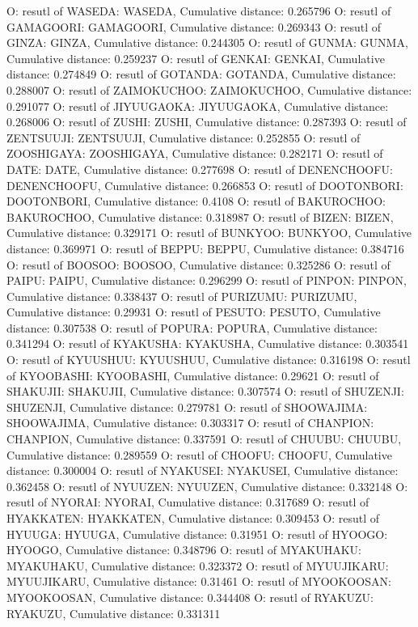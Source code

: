 O: resutl of WASEDA: WASEDA, Cumulative distance: 0.265796
O: resutl of GAMAGOORI: GAMAGOORI, Cumulative distance: 0.269343
O: resutl of GINZA: GINZA, Cumulative distance: 0.244305
O: resutl of GUNMA: GUNMA, Cumulative distance: 0.259237
O: resutl of GENKAI: GENKAI, Cumulative distance: 0.274849
O: resutl of GOTANDA: GOTANDA, Cumulative distance: 0.288007
O: resutl of ZAIMOKUCHOO: ZAIMOKUCHOO, Cumulative distance: 0.291077
O: resutl of JIYUUGAOKA: JIYUUGAOKA, Cumulative distance: 0.268006
O: resutl of ZUSHI: ZUSHI, Cumulative distance: 0.287393
O: resutl of ZENTSUUJI: ZENTSUUJI, Cumulative distance: 0.252855
O: resutl of ZOOSHIGAYA: ZOOSHIGAYA, Cumulative distance: 0.282171
O: resutl of DATE: DATE, Cumulative distance: 0.277698
O: resutl of DENENCHOOFU: DENENCHOOFU, Cumulative distance: 0.266853
O: resutl of DOOTONBORI: DOOTONBORI, Cumulative distance: 0.4108
O: resutl of BAKUROCHOO: BAKUROCHOO, Cumulative distance: 0.318987
O: resutl of BIZEN: BIZEN, Cumulative distance: 0.329171
O: resutl of BUNKYOO: BUNKYOO, Cumulative distance: 0.369971
O: resutl of BEPPU: BEPPU, Cumulative distance: 0.384716
O: resutl of BOOSOO: BOOSOO, Cumulative distance: 0.325286
O: resutl of PAIPU: PAIPU, Cumulative distance: 0.296299
O: resutl of PINPON: PINPON, Cumulative distance: 0.338437
O: resutl of PURIZUMU: PURIZUMU, Cumulative distance: 0.29931
O: resutl of PESUTO: PESUTO, Cumulative distance: 0.307538
O: resutl of POPURA: POPURA, Cumulative distance: 0.341294
O: resutl of KYAKUSHA: KYAKUSHA, Cumulative distance: 0.303541
O: resutl of KYUUSHUU: KYUUSHUU, Cumulative distance: 0.316198
O: resutl of KYOOBASHI: KYOOBASHI, Cumulative distance: 0.29621
O: resutl of SHAKUJII: SHAKUJII, Cumulative distance: 0.307574
O: resutl of SHUZENJI: SHUZENJI, Cumulative distance: 0.279781
O: resutl of SHOOWAJIMA: SHOOWAJIMA, Cumulative distance: 0.303317
O: resutl of CHANPION: CHANPION, Cumulative distance: 0.337591
O: resutl of CHUUBU: CHUUBU, Cumulative distance: 0.289559
O: resutl of CHOOFU: CHOOFU, Cumulative distance: 0.300004
O: resutl of NYAKUSEI: NYAKUSEI, Cumulative distance: 0.362458
O: resutl of NYUUZEN: NYUUZEN, Cumulative distance: 0.332148
O: resutl of NYORAI: NYORAI, Cumulative distance: 0.317689
O: resutl of HYAKKATEN: HYAKKATEN, Cumulative distance: 0.309453
O: resutl of HYUUGA: HYUUGA, Cumulative distance: 0.31951
O: resutl of HYOOGO: HYOOGO, Cumulative distance: 0.348796
O: resutl of MYAKUHAKU: MYAKUHAKU, Cumulative distance: 0.323372
O: resutl of MYUUJIKARU: MYUUJIKARU, Cumulative distance: 0.31461
O: resutl of MYOOKOOSAN: MYOOKOOSAN, Cumulative distance: 0.344408
O: resutl of RYAKUZU: RYAKUZU, Cumulative distance: 0.331311
